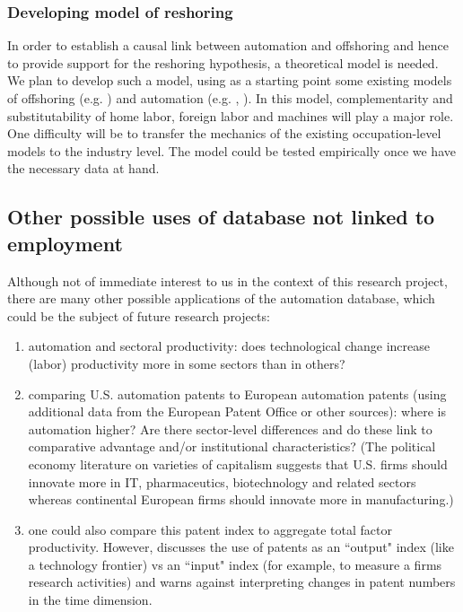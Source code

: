 \documentclass[11pt,a4paper]{article}
\begin{document}
\subsubsection*{Developing model of reshoring}

In order to establish a causal link between automation and offshoring and hence to provide support for the reshoring hypothesis, a theoretical model is needed. We plan to develop such a model, using as a starting point some existing models of offshoring (e.g. \cite{GR2008}) and automation (e.g. \cite{ALM2003}, \cite{L2011}). In this model, complementarity and substitutability of home labor, foreign labor and machines will play a major role. One difficulty will be to transfer the mechanics of the existing occupation-level models to the industry level. The model could be tested empirically once we have the necessary data at hand. 

\subsection{Other possible uses of database not linked to employment}
Although not of immediate interest to us in the context of this research project, there are many other possible applications of the automation database, which could be the subject of future research projects: 
\begin{enumerate}
\item automation and sectoral productivity: does technological change increase (labor) productivity more in some sectors than in others? 
\item comparing U.S. automation patents to European automation patents (using additional data from the European Patent Office or other sources): where is automation higher? Are there sector-level differences and do these link to comparative advantage and/or institutional characteristics? (The political economy literature on varieties of capitalism suggests that U.S. firms should innovate more in IT, pharmaceutics, biotechnology and related sectors whereas continental European firms should innovate more in manufacturing.) 
\item one could also compare this patent index to aggregate total factor productivity. However, \cite{G1998} discusses the use of patents as an  ``output" index (like a technology frontier) vs an ``input" index (for example, to measure a firms research activities) and warns against interpreting changes in patent numbers in the time dimension.
\end{enumerate}
\end{document}
